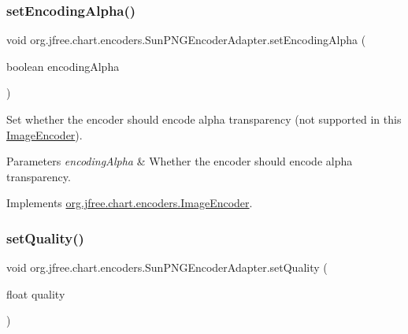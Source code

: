 \mbox{\label{classorg_1_1jfree_1_1chart_1_1encoders_1_1_sun_p_n_g_encoder_adapter_a105f0b1888336e8bd7b5716a05d1184a}} 
\subsubsection{\texorpdfstring{set\+Encoding\+Alpha()}{setEncodingAlpha()}}
{\footnotesize\ttfamily void org.\+jfree.\+chart.\+encoders.\+Sun\+P\+N\+G\+Encoder\+Adapter.\+set\+Encoding\+Alpha (\begin{DoxyParamCaption}\item[{boolean}]{encoding\+Alpha }\end{DoxyParamCaption})}

Set whether the encoder should encode alpha transparency (not supported in this \mbox{\hyperlink{interfaceorg_1_1jfree_1_1chart_1_1encoders_1_1_image_encoder}{Image\+Encoder}}).


\begin{DoxyParams}{Parameters}
{\em encoding\+Alpha} & Whether the encoder should encode alpha transparency. \\
\hline
\end{DoxyParams}


Implements \mbox{\hyperlink{interfaceorg_1_1jfree_1_1chart_1_1encoders_1_1_image_encoder_a1f75e96b9ec512882b6d32c4f0bac3d2}{org.\+jfree.\+chart.\+encoders.\+Image\+Encoder}}.

\mbox{\label{classorg_1_1jfree_1_1chart_1_1encoders_1_1_sun_p_n_g_encoder_adapter_a1cb7ff32f553cea1eccd1767e3050bb9}} 
\subsubsection{\texorpdfstring{set\+Quality()}{setQuality()}}
{\footnotesize\ttfamily void org.\+jfree.\+chart.\+encoders.\+Sun\+P\+N\+G\+Encoder\+Adapter.\+set\+Quality (\begin{DoxyParamCaption}\item[{float}]{quality }\end{DoxyParamCaption})}

